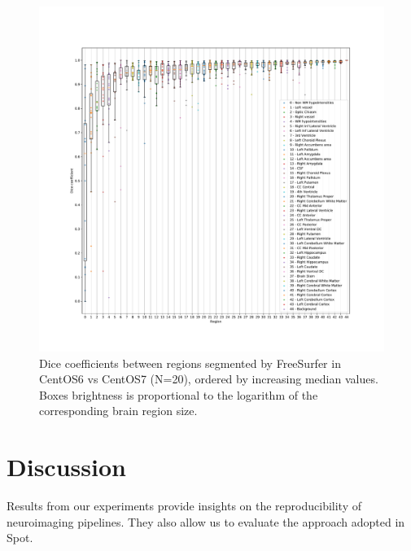 \documentclass[a4paper,num-refs]{oup-contemporary}
\newcommand{\toolname}[0]{Spot\xspace}
\begin{document}
\begin{figure}
  \hspace*{-1cm}
  \includegraphics[width=1.1\linewidth]{figures/dice_regions.pdf}
    \caption{Dice coefficients between regions segmented by FreeSurfer in CentOS6 vs CentOS7 (N=20), ordered by increasing 
    median values. Boxes brightness is proportional to the logarithm of the corresponding brain region size.}
    \label{fig:scatter_plot}
  \end{figure}

  

\section{Discussion}

Results from our experiments provide insights on the reproducibility of
neuroimaging pipelines. They also allow us to evaluate the approach adopted
in \toolname.
\end{document}

